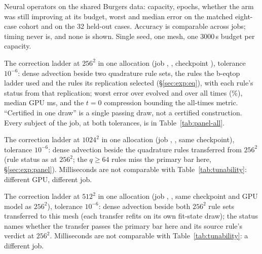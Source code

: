 \begin{table}[h]
\centering
\caption{Neural operators on the shared Burgers data: capacity, epochs, whether
the arm was still improving at its budget, worst and median error on the
matched eight-case cohort and on the 32 held-out cases. Accuracy is comparable
across jobs; timing never is, and none is shown. Single seed, one mesh, one
3000\,s budget per capacity.}
\label{tab:operators}
\resizebox{\linewidth}{!}{}
\end{table}

\begin{table}[h]
\centering
\caption{The correction ladder at $256^2$ in one allocation (job
\provPanelJob, \provPanelGpu, checkpoint \provPanelCkpt), tolerance $10^{-6}$:
dense advection beside two quadrature rule sets, the rules the b-eqtop ladder
used and the rules its replication selected (\S\ref{sec:exp:eq}), with each
rule's status from that replication; worst error over evolved and over all
times (\%), median GPU ms, and the $t{=}0$ compression bounding the all-times
metric. ``Certified in one draw'' is a single passing draw, not a certified
construction. Every subject of the job, at both tolerances, is in
Table~\ref{tab:panel-all}.}
\label{tab:tunability}
\resizebox{\linewidth}{!}{}
\end{table}

\begin{table}[h]
\centering
\caption{The correction ladder at $1024^2$ in one allocation (job
\provPanelTenTwentyFourJob, \provPanelTenTwentyFourGpu, same checkpoint),
tolerance $10^{-6}$: dense advection beside the quadrature rules transferred
from $256^2$ (rule status as at $256^2$; the $q\ge64$ rules miss the primary
bar here, \S\ref{sec:exp:panel}). Milliseconds are not comparable with
Table~\ref{tab:tunability}: different GPU, different job.}
\label{tab:tunability-tentwentyfour}
\resizebox{\linewidth}{!}{}
\end{table}

\begin{table}[h]
\centering
\caption{The correction ladder at $512^2$ in one allocation (job
\provPanelFiveTwelveJob, \provPanelFiveTwelveGpu, same checkpoint and GPU
model as $256^2$), tolerance $10^{-6}$: dense advection beside both
$256^2$ rule sets transferred to this mesh (each transfer refits on its
own fit-state draw); the status names whether the transfer passes the
primary bar here and its source rule's verdict at $256^2$. Milliseconds
are not comparable with Table~\ref{tab:tunability}: a different job.}
\label{tab:tunability-fivetwelve}
\resizebox{\linewidth}{!}{}
\end{table}

